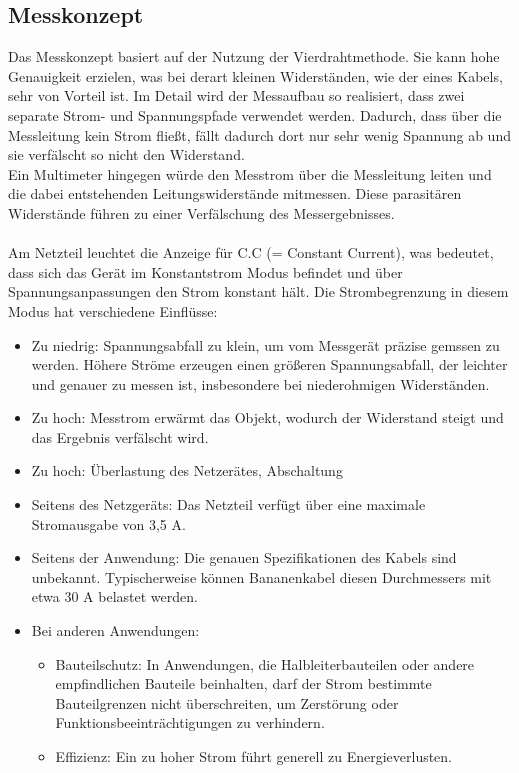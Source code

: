 \documentclass[a4paper,12pt]{article}
\begin{document}
\subsection{Messkonzept}
Das Messkonzept basiert auf der Nutzung der Vierdrahtmethode. Sie kann hohe Genauigkeit erzielen, was bei derart kleinen Widerständen, wie der eines Kabels, sehr von Vorteil ist. Im Detail wird der Messaufbau so realisiert, dass zwei separate Strom- und Spannungspfade verwendet werden. Dadurch, dass über die Messleitung kein Strom fließt, fällt dadurch dort nur sehr wenig Spannung ab und sie verfälscht so nicht den Widerstand.\\
\noindent Ein Multimeter hingegen würde den Messtrom über die Messleitung leiten und die dabei entstehenden Leitungswiderstände mitmessen. Diese parasitären Widerstände führen zu einer Verfälschung des Messergebnisses. \\\\
\noindent Am Netzteil leuchtet die Anzeige für C.C (= Constant Current), was bedeutet, dass sich das Gerät im Konstantstrom Modus befindet und über Spannungsanpassungen den Strom konstant hält. Die Strombegrenzung in diesem Modus hat verschiedene Einflüsse:
\begin{itemize}
\item Zu niedrig: Spannungsabfall zu klein, um vom Messgerät präzise gemssen zu werden. Höhere Ströme erzeugen einen größeren Spannungsabfall, der leichter und genauer zu messen ist, insbesondere bei niederohmigen Widerständen.
\item Zu hoch: Messtrom erwärmt das Objekt, wodurch der Widerstand steigt und das Ergebnis verfälscht wird.
\item Zu hoch: Überlastung des Netzerätes, Abschaltung\\
\end{itemize}
\newpage
{}
\begin{itemize}
\item Seitens des Netzgeräts: Das Netzteil verfügt über eine maximale Stromausgabe von 3,5 A.
\item Seitens der Anwendung: Die genauen Spezifikationen des Kabels sind unbekannt. Typischerweise können Bananenkabel diesen Durchmessers mit etwa 30 A belastet werden. 
\item Bei anderen Anwendungen: 
	\begin{itemize}
	\item Bauteilschutz: In Anwendungen, die Halbleiterbauteilen oder andere empfindlichen Bauteile beinhalten, darf der Strom bestimmte Bauteilgrenzen nicht überschreiten, um Zerstörung oder Funktionsbeeinträchtigungen zu verhindern.
	\item Effizienz: Ein zu hoher Strom führt generell zu Energieverlusten.\\
	\end{itemize}
\end{itemize}
\end{document}
